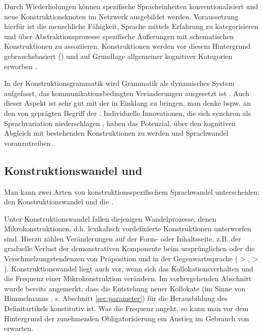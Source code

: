Durch Wiederholungen können spezifische Spracheinheiten konventionalisiert und neue Konstruktionsknoten im Netzwerk ausgebildet werden. Voraussetzung hierfür ist die menschliche Fähigkeit, Sprache mittels Erfahrung zu kategorisieren und über Abstraktionsprozesse spezifische Äußerungen mit schematischen Konstruktionen zu assoziieren. Konstruktionen werden vor diesem Hintergrund gebrauchsbasiert () und auf Grundlage allgemeiner kognitiver Kategorien erworben \parencite[u.a.][]{Langacker1987,Goldberg2006,Bybee2006,Bybee2010,Bybee2013}.

In der Konstruktionsgrammatik wird Grammatik als dynamisches System aufgefasst, das kommunikationsbedingten Veränderungen ausgesetzt ist \parencite[35--36]{Imo2007}. Auch dieser Aspekt ist sehr gut mit der  in Einklang zu bringen, man denke bspw. an den von  \textcite{Hopper1991} geprägten Begriff der . Individuelle Innovationen, die sich synchron als Sprachvariation niederschlagen \parencite{Croft2010}, haben das Potenzial, über den kognitiven Abgleich mit bestehenden Konstruktionen  zu werden und Sprachwandel voranzutreiben \parencite[66]{Langacker1987}. 

\subsection{Konstruktionswandel und }\label{sec:konstruktionalisierung}

Man kann zwei Arten von konstruktionsspezifischem Sprachwandel unterscheiden: den Konstruktionswandel und die  \parencite[vgl.][]{Hilpert2011,Hilpert2013,Fried2013,Traugott2013,Traugott2015,Trousdale2014}. 

Unter Konstruktionswandel fallen diejenigen Wandelprozesse, denen Mikrokonstruktionen, d.h. lexikalisch vordefinierte Konstruktionen unterworfen sind. Hierzu zählen Veränderungen auf der Form- oder Inhaltsseite, z.B. der graduelle Verlust der demonstrativen Komponente beim ursprünglichen   oder die Verschmelzungstendenzen von Präposition und  in der Gegenwartssprache ( > ,  > ). Konstruktionswandel liegt auch vor, wenn sich das Kollokationsverhalten und die Frequenz einer Mikrokonstruktion  verändern. Im vorhergehenden Abschnitt wurde bereits angemerkt, dass die Entstehung neuer Kollokate (im Sinne von Himmelmanns  , s. Abschnitt \ref{sec:parameter}) für die Herausbildung des Definitartikels konstitutiv ist. Was die Frequenz angeht, so kann man vor dem Hintergrund der zunehmenden Obligatorisierung ein Anstieg im Gebrauch von  erwarten. 

